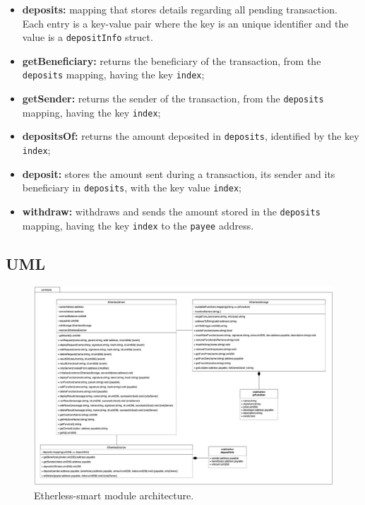 	\begin{itemize}
		\item \textbf{deposits:} mapping that stores details regarding all pending transaction. Each entry is a key-value pair where the key is an unique identifier and the value is a \texttt{depositInfo} struct.	
		\end{itemize}
	\begin{itemize}
		\item \textbf{getBeneficiary:} returns the beneficiary of the transaction, from the \texttt{deposits} mapping, having the key \texttt{index};
		\item \textbf{getSender:} returns the sender of the transaction, from the \texttt{deposits} mapping, having the key \texttt{index};
		\item \textbf{depositsOf:} returns the amount deposited in \texttt{deposits}, identified by the key \texttt{index};
		\item \textbf{deposit:} stores the amount sent during a transaction, its sender and its beneficiary in \texttt{deposits}, with the key value \texttt{index};
		\item \textbf{withdraw:} withdraws and sends the amount stored in the \texttt{deposits} mapping, having the key \texttt{index} to the \texttt{payee} address.
	\end{itemize}

	\begin{landscape}
	\subsection{UML}
		\begin{figure}[H]
			\includegraphics[width=21cm]{./diagrammi/etherless-smart/Etherless-smart.jpg}
			\caption{Etherless-smart module architecture.}
		\end{figure}
	\end{landscape}
	\restoregeometry
		
